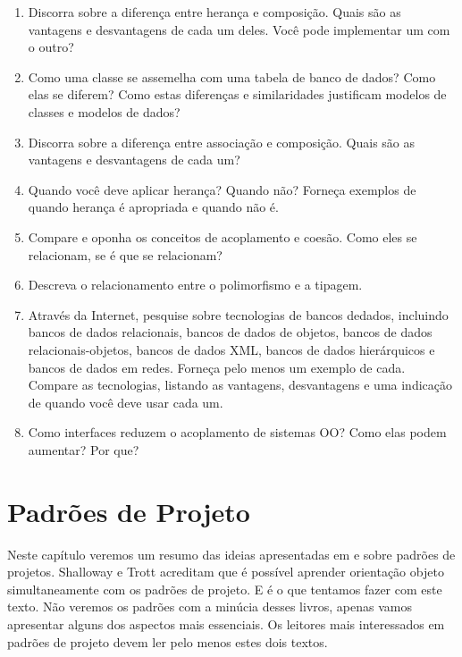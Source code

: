 \documentclass[
	11pt,				%
	openright,
	twoside,			%
	a4paper,			%
	english,			%
	french,
	brazil,				%
	sumario=tradicional
	]{abntex2}
\begin{document}
\begin{enumerate}
\item Discorra sobre a diferença entre herança e composição. Quais são as vantagens e desvantagens de cada um deles. Você pode implementar um com o outro?

\item Como uma classe se assemelha com uma tabela de banco de dados? Como elas se diferem? Como estas diferenças e similaridades justificam modelos de classes e modelos de dados?

\item Discorra sobre a diferença entre associação e composição. Quais são as vantagens e desvantagens de cada um?

\item Quando você deve aplicar herança? Quando não? Forneça exemplos de quando herança é apropriada e quando não é.

\item Compare e oponha os conceitos de acoplamento e coesão. Como eles se relacionam, se é que se relacionam?

\item Descreva o relacionamento entre o polimorfismo e a tipagem.

\item Através da Internet, pesquise sobre tecnologias de bancos dedados, incluindo bancos de dados relacionais, bancos de dados de objetos, bancos de dados relacionais-objetos, bancos de dados XML, bancos de dados hierárquicos e bancos de dados em redes. Forneça pelo menos um exemplo de cada. Compare as tecnologias, listando as vantagens, desvantagens e uma indicação de quando você deve usar cada um.

\item Como interfaces reduzem o acoplamento de sistemas OO? Como elas podem aumentar? Por que?
\end{enumerate}

\chapter{Padrões de Projeto}

Neste capítulo veremos um resumo das ideias apresentadas em \cite{DP:explained} e \cite{design:patterns} sobre padrões de projetos. Shalloway e Trott acreditam que é possível aprender orientação objeto simultaneamente com os padrões de projeto. E é o que tentamos fazer com este texto. Não veremos os padrões com a minúcia desses livros, apenas vamos apresentar alguns dos aspectos mais essenciais. Os leitores mais interessados em padrões de projeto devem ler pelo menos estes dois textos.
\end{document}
